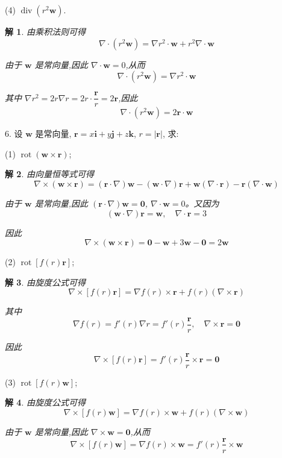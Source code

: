 \documentclass[a4paper,12pt]{article}
\newtheorem*{sol}{解}
\begin{document}
(4) $\operatorname{div} \left(r^2 \boldsymbol{w}\right)$.
\begin{sol}
    由乘积法则可得
    $$\nabla\cdot(r^2\boldsymbol{w})=\nabla r^2\cdot \boldsymbol{w}+r^2\nabla\cdot \boldsymbol{w}$$

    由于 $\boldsymbol{w}$ 是常向量,因此 $\nabla\cdot \boldsymbol{w}=0$,从而
    $$\nabla\cdot(r^2\boldsymbol{w})=\nabla r^2\cdot \boldsymbol{w}$$

    其中 $\nabla r^2=2r\nabla r=2r\cdot\dfrac{\boldsymbol{r}}{r}=2\boldsymbol{r}$,因此
    $$\nabla\cdot(r^2\boldsymbol{w})=2\boldsymbol{r}\cdot \boldsymbol{w}$$
\end{sol}


6. 设 $\boldsymbol{w}$ 是常向量, $\boldsymbol{r} = x\boldsymbol{i} + y\boldsymbol{j} + z\boldsymbol{k}$, $r = |\boldsymbol{r}|$, 求:

(1) $\operatorname{rot}\left(\boldsymbol{w} \times \boldsymbol{r}\right)$;
\begin{sol}
    由向量恒等式可得
    $$\nabla\times(\boldsymbol{w}\times\boldsymbol{r})=(\boldsymbol{r}\cdot\nabla)\boldsymbol{w}-(\boldsymbol{w}\cdot\nabla)\boldsymbol{r}+\boldsymbol{w}(\nabla\cdot\boldsymbol{r})-\boldsymbol{r}(\nabla\cdot\boldsymbol{w})$$

    由于 $\boldsymbol{w}$ 是常向量,因此 $(\boldsymbol{r}\cdot\nabla)\boldsymbol{w}=\boldsymbol{0}$, $\nabla\cdot\boldsymbol{w}=0$。又因为
    $$(\boldsymbol{w}\cdot\nabla)\boldsymbol{r}=\boldsymbol{w},\quad \nabla\cdot\boldsymbol{r}=3$$

    因此
    $$\nabla\times(\boldsymbol{w}\times\boldsymbol{r})=\boldsymbol{0}-\boldsymbol{w}+3\boldsymbol{w}-\boldsymbol{0}=2\boldsymbol{w}$$
\end{sol}

(2) $\operatorname{rot}\left[f(r)\boldsymbol{r}\right]$;
\begin{sol}
    由旋度公式可得
    $$\nabla\times[f(r)\boldsymbol{r}]
        =\nabla f(r)\times\boldsymbol{r}+f(r)(\nabla\times\boldsymbol{r})$$

    其中
    $$\nabla f(r)=f'(r)\nabla r=f'(r)\dfrac{\boldsymbol{r}}{r},\quad \nabla\times\boldsymbol{r}=\boldsymbol{0}$$

    因此
    $$\nabla\times[f(r)\boldsymbol{r}]=f'(r)\dfrac{\boldsymbol{r}}{r}\times\boldsymbol{r}=\boldsymbol{0}$$
\end{sol}

(3) $\operatorname{rot}\left[f(r)\boldsymbol{w}\right]$;
\begin{sol}
    由旋度公式可得
    $$\nabla\times[f(r)\boldsymbol{w}]
        =\nabla f(r)\times\boldsymbol{w}+f(r)(\nabla\times\boldsymbol{w})$$

    由于 $\boldsymbol{w}$ 是常向量,因此 $\nabla\times\boldsymbol{w}=\boldsymbol{0}$,从而
    $$\nabla\times[f(r)\boldsymbol{w}]=\nabla f(r)\times\boldsymbol{w}=f'(r)\dfrac{\boldsymbol{r}}{r}\times\boldsymbol{w}$$
\end{sol}
\end{document}
